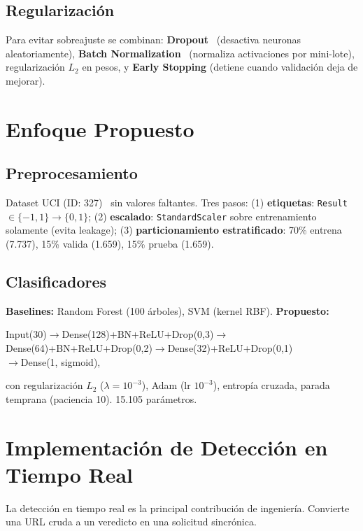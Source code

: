 \documentclass[conference]{IEEEtran}
\begin{document}
\subsection{Regularización}
Para evitar sobreajuste se combinan: \textbf{Dropout}~\cite{srivastava2014} (desactiva neuronas aleatoriamente), \textbf{Batch Normalization}~\cite{ioffe2015} (normaliza activaciones por mini-lote), regularización $L_2$ en pesos, y \textbf{Early Stopping} (detiene cuando validación deja de mejorar).

\section{Enfoque Propuesto}
\subsection{Preprocesamiento}
Dataset UCI (ID: 327)~\cite{uci327} sin valores faltantes. Tres pasos: (1) \textbf{etiquetas}: \texttt{Result} $\in \{-1,1\} \to \{0,1\}$; (2) \textbf{escalado}: \texttt{StandardScaler} sobre entrenamiento solamente (evita leakage); (3) \textbf{particionamiento estratificado}: 70\% entrena (7.737), 15\% valida (1.659), 15\% prueba (1.659).

\subsection{Clasificadores}
\textbf{Baselines:} Random Forest (100 árboles), SVM (kernel RBF). \textbf{Propuesto:}
\begin{center}
\small
Input(30)$\to$Dense(128)+BN+ReLU+Drop(0,3)$\to$\\
Dense(64)+BN+ReLU+Drop(0,2)$\to$Dense(32)+ReLU+Drop(0,1)\\
$\to$Dense(1, sigmoid),
\end{center}
con regularización $L_2$ ($\lambda=10^{-3}$), Adam (lr $10^{-3}$), entropía cruzada, parada temprana (paciencia 10). 15.105 parámetros.

\section{Implementación de Detección en Tiempo Real}
La detección en tiempo real es la principal contribución de ingeniería. Convierte una URL cruda a un veredicto en una solicitud sincrónica.
\end{document}
